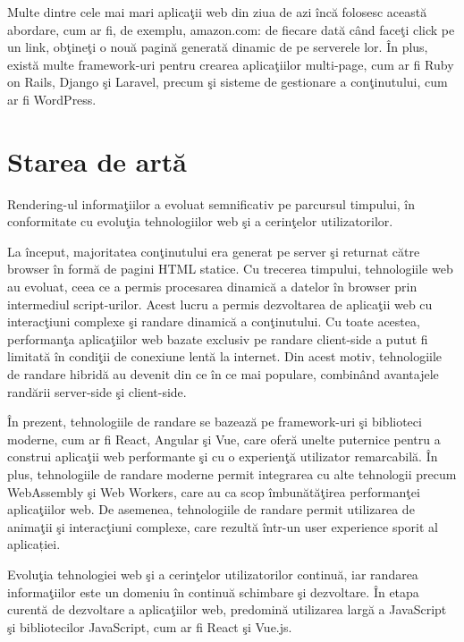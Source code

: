 \documentclass[12pt, a4paper]{report}
\begin{document}
Multe dintre cele mai mari aplica\c tii web din ziua de azi \^ inc\u a folosesc aceast\u a abordare, cum ar fi, de exemplu, amazon.com: de fiecare dat\u a c\^ and face\c ti click pe un link, ob\c tine\c ti o nou\u a pagin\u a generat\u a dinamic de pe serverele lor. \^ In plus, exist\u a multe framework-uri pentru crearea  aplica\c tiilor multi-page, cum ar fi Ruby on Rails, Django \c si Laravel, precum \c si sisteme de gestionare a con\c tinutului, cum ar fi WordPress. 

\section{Starea de art\u a}

Rendering-ul informa\c tiilor a evoluat semnificativ pe parcursul timpului, \^ in conformitate cu evolu\c tia tehnologiilor web \c si a cerin\c telor utilizatorilor.

La \^ inceput, majoritatea con\c tinutului era generat pe server \c si returnat c\u atre browser \^ in form\u a de pagini HTML statice. Cu trecerea timpului, tehnologiile web au evoluat, ceea ce a permis procesarea dinamic\u a a datelor în browser prin intermediul script-urilor. Acest lucru a permis dezvoltarea de aplica\c tii web cu interac\c tiuni complexe \c si randare dinamic\u a a con\c tinutului. Cu toate acestea, performan\c ta aplica\c tiilor web bazate exclusiv pe randare client-side a putut fi limitat\u a \^ in condi\c tii de conexiune lent\u a la internet. Din acest motiv, tehnologiile de randare hibrid\u a au devenit din ce \^ in ce mai populare, combin\^ and avantajele rand\u arii server-side \c si client-side. \cite{html}

\^ In prezent, tehnologiile de randare se bazeaz\u a pe framework-uri \c si biblioteci moderne, cum ar fi React, Angular \c si Vue, care ofer\u a unelte puternice pentru a construi aplica\c tii web performante \c si cu o experien\c t\u a utilizator remarcabil\u a. \^ In plus, tehnologiile de randare moderne permit integrarea cu alte tehnologii precum WebAssembly \c si Web Workers, care au ca scop \^ imbun\u at\u a\c tirea performan\c tei aplica\c tiilor web. De asemenea, tehnologiile de randare permit utilizarea de anima\c tii \c si interac\c tiuni complexe, care rezultă într-un user experience sporit al aplicației.

Evolu\c tia tehnologiei web \c si a cerin\c telor utilizatorilor continu\u a, iar randarea informa\c tiilor este un domeniu \^ in continu\u a schimbare \c si dezvoltare. \^ In etapa curent\u a de dezvoltare a aplica\c tiilor web, predomin\u a utilizarea larg\u a a JavaScript \c si bibliotecilor JavaScript, cum ar fi React \c si Vue.js.
\end{document}
